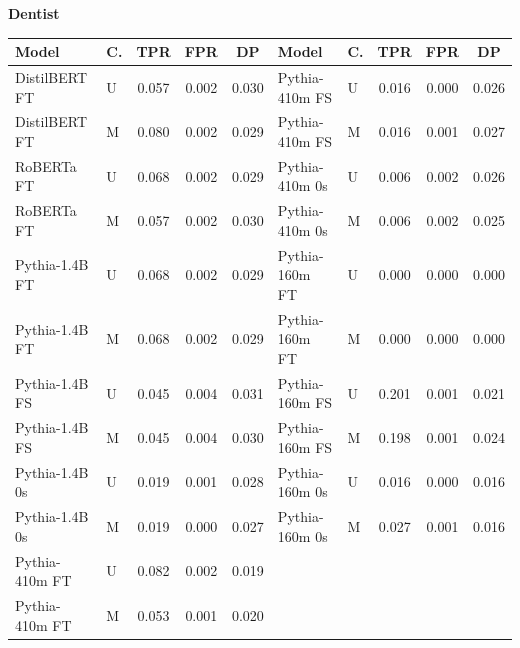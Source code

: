 \documentclass[11pt]{article}
\begin{document}
\vspace{4pt}\noindent\textbf{Dentist}
\begin{center}\scriptsize
\begin{tabular}{llccc|llccc}
\toprule
\textbf{Model} & \textbf{C.} & \textbf{TPR} & \textbf{FPR} & \textbf{DP} & \textbf{Model} & \textbf{C.} & \textbf{TPR} & \textbf{FPR} & \textbf{DP} \\
\midrule
DistilBERT FT & U & 0.057 & 0.002 & 0.030 & Pythia-410m FS & U & 0.016 & 0.000 & 0.026 \\
DistilBERT FT & M & 0.080 & 0.002 & 0.029 & Pythia-410m FS & M & 0.016 & 0.001 & 0.027 \\
RoBERTa FT & U & 0.068 & 0.002 & 0.029 & Pythia-410m 0s & U & 0.006 & 0.002 & 0.026 \\
RoBERTa FT & M & 0.057 & 0.002 & 0.030 & Pythia-410m 0s & M & 0.006 & 0.002 & 0.025 \\
Pythia-1.4B FT & U & 0.068 & 0.002 & 0.029 & Pythia-160m FT & U & 0.000 & 0.000 & 0.000 \\
Pythia-1.4B FT & M & 0.068 & 0.002 & 0.029 & Pythia-160m FT & M & 0.000 & 0.000 & 0.000 \\
Pythia-1.4B FS & U & 0.045 & 0.004 & 0.031 & Pythia-160m FS & U & 0.201 & 0.001 & 0.021 \\
Pythia-1.4B FS & M & 0.045 & 0.004 & 0.030 & Pythia-160m FS & M & 0.198 & 0.001 & 0.024 \\
Pythia-1.4B 0s & U & 0.019 & 0.001 & 0.028 & Pythia-160m 0s & U & 0.016 & 0.000 & 0.016 \\
Pythia-1.4B 0s & M & 0.019 & 0.000 & 0.027 & Pythia-160m 0s & M & 0.027 & 0.001 & 0.016 \\
Pythia-410m FT & U & 0.082 & 0.002 & 0.019 & & & & & \\
Pythia-410m FT & M & 0.053 & 0.001 & 0.020 & & & & & \\
\bottomrule
\end{tabular}
\end{center}
\end{document}
